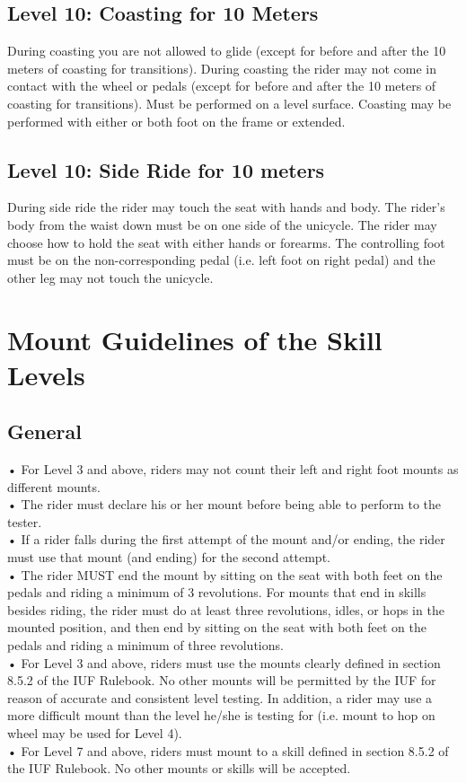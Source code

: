 \subsection{Level 10: Coasting for 10 Meters}
During coasting you are not allowed to glide (except for before and after the 10 meters of coasting for transitions).
During coasting the rider may not come in contact with the wheel or pedals (except for before and after the 10 meters
of coasting for transitions). Must be performed on a level surface. Coasting may be performed with either or both foot
on the frame or extended.
\subsection{Level 10: Side Ride for 10 meters}
During side ride the rider may touch the seat with hands and body. The rider's body from the waist down must be on
one side of the unicycle. The rider may choose how to hold the seat with either hands or forearms. The controlling foot
must be on the non-corresponding pedal (i.e. left foot on right pedal) and the other leg may not touch the unicycle.
\section{Mount Guidelines of the Skill Levels}
\subsection{General}
• For Level 3 and above, riders may not count their left and right foot mounts as different mounts.\\
• The rider must declare his or her mount before being able to perform to the tester.\\
• If a rider falls during the first attempt of the mount and/or ending, the rider must use that mount (and ending) for the
second attempt.\\
• The rider MUST end the mount by sitting on the seat with both feet on the pedals and riding a minimum of 3
revolutions. For mounts that end in skills besides riding, the rider must do at least three revolutions, idles, or hops
in the mounted position, and then end by sitting on the seat with both feet on the pedals and riding a minimum of
three revolutions.\\
• For Level 3 and above, riders must use the mounts clearly defined in section 8.5.2 of the IUF Rulebook. No other
mounts will be permitted by the IUF for reason of accurate and consistent level testing. In addition, a rider may
use a more difficult mount than the level he/she is testing for (i.e. mount to hop on wheel may be used for Level
4).\\
• For Level 7 and above, riders must mount to a skill defined in section 8.5.2 of the IUF Rulebook. No other mounts
or skills will be accepted.\\
